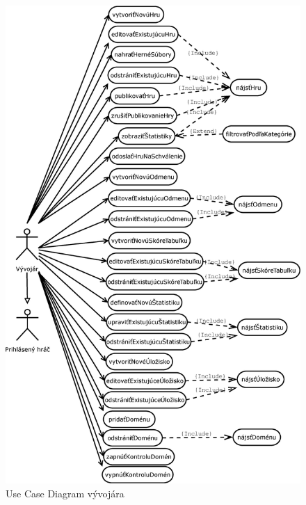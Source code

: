 \begin{figure}[h]
  \centering
  \includegraphics[scale=0.3]{fig/ucd-vyvojar.eps}
  \caption{Use Case Diagram vývojára}
  \label{fig:ucdvyvojar}
\end{figure}

